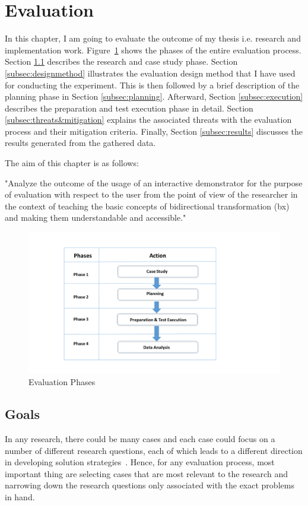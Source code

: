 \section{Evaluation}\label{sec:evaluation} 
In this chapter, I am going to evaluate the outcome of my thesis i.e. research and implementation work. 
Figure~\ref{fig:Evaluation_Phases} shows the phases of the entire evaluation process. Section \ref{subsec:goals} describes the research and case study phase. Section \ref{subsec:designmethod} illustrates the evaluation design method that I have used for conducting the experiment. This is then followed by a brief description of the planning phase in Section \ref{subsec:planning}. Afterward, Section \ref{subsec:execution} describes the preparation and test execution phase in detail. Section \ref{subsec:threats&mitigation} explains the associated threats with the evaluation process and their mitigation criteria. Finally, Section \ref{subsec:results} discusses the results generated from the gathered data. 

The aim of this chapter is as follows: 

"Analyze the outcome of the usage of an interactive demonstrator for the purpose of evaluation with respect to the user from the point of view of the researcher in the context of teaching the basic concepts of bidirectional transformation (bx) and making them understandable and accessible."

\begin{figure}[h]
	\includegraphics[width=1\textwidth]{figures/Evaluation_Phases}
	\caption{Evaluation Phases}
	\label{fig:Evaluation_Phases}
\end{figure}

\subsection{Goals}\label{subsec:goals}  
In any research, there could be many cases and each case could focus on a number of different research questions, each of which leads to a different direction in developing solution strategies~\cite{semethods}. Hence, for any evaluation process, most important thing are selecting cases that are most relevant to the research and narrowing down the research questions only associated with the exact problems in hand. 

